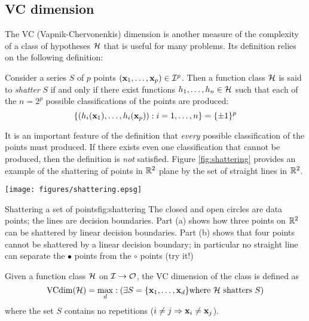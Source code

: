 \subsection{VC dimension}
\label{acr:vcdim}
\label{sec:vcdim}

The VC (Vapnik-Chervonenkis) dimension is another measure of the
complexity of a class of hypotheses $\mathcal{H}$ that is useful for many
problems.  Its definition relies on the following definition:

\begin{definition}[Shattering]
Consider a series $S$ of $p$ points $(\mathbf{x}_1, \ldots, \mathbf{x}_p) \in
\mathcal{I}^p$.  Then a function class $\mathcal{H}$ is said to \emph{shatter} $S$ 
if and only if there exist functions $h_1, \ldots, h_n \in \mathcal{H}$ such
that each of the $n = 2^p$ possible classifications of the points are
produced: 
%
\begin{equation}
\left\{ (h_i(\mathbf{x}_1), \ldots, h_i(\mathbf{x}_p)): i=1, \ldots, n \right\}
= \{\pm 1\}^p
\end{equation}
%
\end{definition}

It is an important feature of the definition that \emph{every}
possible classification of the points must produced.  If there exists
even one classification that cannot be produced, then the definition
is \emph{not} satisfied.  Figure \ref{fig:shattering} provides an
example of the shattering of points in $\mathbb{R}^2$ plane by the set of
straight lines in $\mathbb{R}^2$. 

\begin{linefigure}
\begin{center}
\texttt{[image: figures/shattering.epsg]}
\end{center}
\begin{capt}{Shattering a set of points}{fig:shattering}
The closed and open circles are data points; the lines are decision
boundaries.  Part (a) shows how three points on $\mathbb{R}^2$ can be
shattered by linear decision boundaries.  Part (b) shows that four
points cannot be shattered by a linear decision boundary; in
particular no straight line can separate the $\bullet$ points from the
$\circ$ points (try it!)
\end{capt}
\end{linefigure}

\begin{definition}[VC dimension]
\label{thm:vcdim bound}
Given a function class $\mathcal{H}$ on $\mathcal{I} \rightarrow \mathcal{O}$, the VC
dimension of the class is defined as
%
\begin{equation}
\mathrm{VCdim}(\mathcal{H}) = \max_{d} : ( \exists S = \{\mathbf{x}_1, \ldots, \mathbf{x}_d\} 
\mbox{\rm where $\mathcal{H}$ shatters $S$})
\end{equation}
%
where the set $S$ contains no repetitions ($i \neq j \Rightarrow
\mathbf{x}_i \neq \mathbf{x}_j$).
\end{definition}

